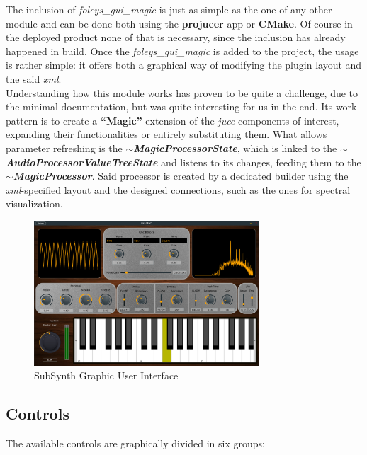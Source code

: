 \documentclass{article}
\begin{document}
The inclusion of \textit{foleys\_gui\_magic} is just as simple as the one of any other module and can be done both using the \textbf{projucer} app or \textbf{CMake}. Of course in the deployed product none of that is necessary, since the inclusion has already happened in build. Once the \textit{foleys\_gui\_magic} is added to the project, the usage is rather simple: it offers both a graphical way of modifying the plugin layout and the said \textit{xml}.
\\
Understanding how this module works has proven to be quite a challenge, due to the minimal documentation, but was quite interesting for us in the end. Its work pattern is to create a \textbf{“Magic”} extension of the \textit{juce} components of interest, expanding their functionalities or entirely substituting them. What allows parameter refreshing is the \textit{\textbf{$\sim$MagicProcessorState}}, which is linked to the \textit{\textbf{$\sim$AudioProcessorValueTreeState}} and listens to its changes, feeding them to the \textit{\textbf{$\sim$MagicProcessor}}. Said processor is created by a dedicated builder using the \textit{xml}-specified layout and the designed connections, such as the ones for spectral visualization. 
\vspace{20pt}
\begin{figure}[H]
\centering
  \includegraphics[width=0.75\textwidth]{DefOranJam.png}
    \caption{SubSynth Graphic User Interface}
\end{figure}
\vspace{5pt}

\subsection{Controls}
The available controls are graphically divided in six groups:
\end{document}
